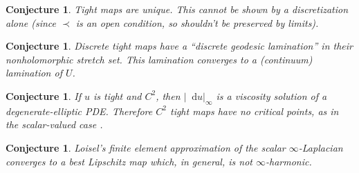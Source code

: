 \documentclass[reqno,11pt]{amsart}
\newcommand*\dif{\mathop{}\!\mathrm{d}}
\newtheorem{conjecture}[theorem]{Conjecture}
\theoremstyle{definition}
\numberwithin{equation}{section}
\begin{document}
\begin{conjecture}
Tight maps are unique. This cannot be shown by a discretization alone (since $\prec$ is an open condition, so shouldn't be preserved by limits).
\end{conjecture}

\begin{conjecture}
Discrete tight maps have a ``discrete geodesic lamination'' in their nonholomorphic stretch set.
This lamination converges to a (continuum) lamination of $U$.
\end{conjecture}

\begin{conjecture}
If $u$ is tight and $C^2$, then $|\dif u|_\infty$ is a viscosity solution of a degenerate-elliptic PDE.
Therefore $C^2$ tight maps have no critical points, as in the scalar-valued case \cite{Yu2006}.
\end{conjecture}

\begin{conjecture}
Loisel's finite element approximation of the scalar $\infty$-Laplacian \cite{Loisel_2020} converges to a best Lipschitz map which, in general, is not $\infty$-harmonic.
\end{conjecture}

\printbibliography
\end{document}
